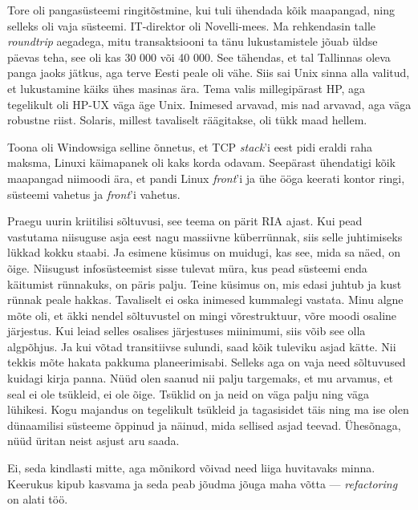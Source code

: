 Tore oli pangasüsteemi ringitõstmine, kui tuli ühendada kõik 
maapangad, ning selleks oli vaja süsteemi. 
IT-direktor oli 
Novelli-mees. Ma rehkendasin talle \emph{roundtrip} aegadega, mitu 
transaktsiooni ta tänu lukustamistele jõuab üldse päevas teha, see oli kas 30 
000 või 40 000. See tähendas, et tal Tallinnas oleva 
panga jaoks jätkus, aga terve Eesti peale oli vähe. Siis sai Unix sinna alla 
valitud, et lukustamine käiks ühes masinas ära. Tema valis millegipärast HP, aga
tegelikult oli HP-UX väga äge Unix. Inimesed arvavad, mis 
nad arvavad, aga väga robustne riist. Solaris, millest tavaliselt 
räägitakse, oli tükk maad hellem. 

Toona oli Windowsiga selline õnnetus, et TCP \emph{stack}'i eest 
pidi eraldi raha maksma, Linuxi käimapanek oli kaks korda odavam. Seepärast ühendatigi
kõik maapangad niimoodi ära, et pandi Linux \emph{front}'i ja 
ühe ööga keerati kontor ringi, süsteemi vahetus ja \emph{front}'i vahetus. 


Praegu uurin kriitilisi sõltuvusi, see teema on pärit 
RIA ajast. 
Kui pead vastutama niisuguse asja eest nagu massiivne küberrünnak, siis 
selle juhtimiseks lükkad kokku staabi. Ja esimene küsimus on muidugi, kas see, mida sa näed, on õige. Niisugust infosüsteemist 
sisse tulevat müra, kus pead süsteemi enda käitumist rünnakuks, on 
päris palju. Teine küsimus on, mis edasi 
juhtub ja kust rünnak peale hakkas. Tavaliselt ei oska inimesed kummalegi 
vastata. Minu algne mõte oli, et äkki nendel sõltuvustel on mingi 
võrestruktuur, võre moodi osaline järjestus. Kui leiad
selles osalises järjestuses miinimumi, siis võib see olla algpõhjus. Ja kui võtad transitiivse 
sulundi, saad kõik tuleviku asjad kätte. Nii tekkis mõte hakata pakkuma 
planeerimisabi. Selleks aga on vaja 
need sõltuvused kuidagi kirja panna. Nüüd olen saanud nii palju targemaks, 
et mu arvamus, et seal ei ole tsükleid, ei ole õige. Tsüklid on ja neid on väga 
palju ning väga lühikesi. Kogu majandus on tegelikult tsükleid ja tagasisidet 
täis ning ma ise olen dünaamilisi süsteeme õppinud ja näinud, mida sellised asjad teevad. Ühesõnaga, nüüd üritan neist asjust aru saada.


Ei, seda kindlasti mitte, aga mõnikord võivad need liiga huvitavaks minna. 
Keerukus kipub kasvama ja seda peab jõudma
jõuga maha võtta --- \emph{refactoring} on alati töö.
